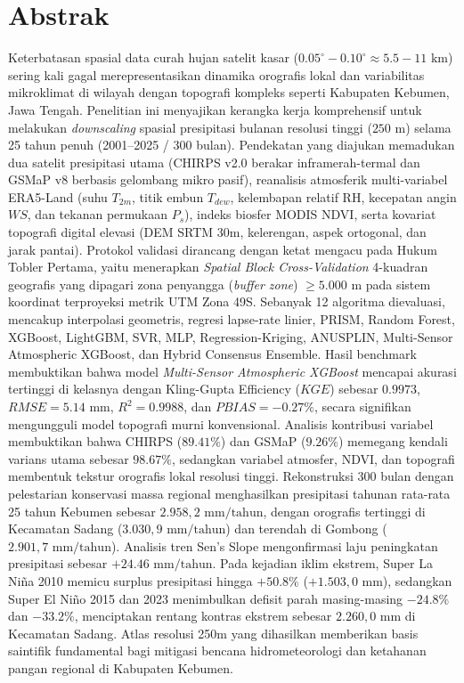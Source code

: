 \documentclass[11pt,a4paper,titlepage]{article}
\begin{document}
\section*{Abstrak}
Keterbatasan spasial data curah hujan satelit kasar ($0.05^\circ - 0.10^\circ \approx 5.5 - 11\text{ km}$) sering kali gagal merepresentasikan dinamika orografis lokal dan variabilitas mikroklimat di wilayah dengan topografi kompleks seperti Kabupaten Kebumen, Jawa Tengah. Penelitian ini menyajikan kerangka kerja komprehensif untuk melakukan \textit{downscaling} spasial presipitasi bulanan resolusi tinggi ($250\text{ m}$) selama 25 tahun penuh (2001--2025 / 300 bulan). Pendekatan yang diajukan memadukan dua satelit presipitasi utama (CHIRPS v2.0 berakar inframerah-termal dan GSMaP v8 berbasis gelombang mikro pasif), reanalisis atmosferik multi-variabel ERA5-Land (suhu $T_{2m}$, titik embun $T_{dew}$, kelembapan relatif $\text{RH}$, kecepatan angin $WS$, dan tekanan permukaan $P_s$), indeks biosfer MODIS NDVI, serta kovariat topografi digital elevasi (DEM SRTM 30m, kelerengan, aspek ortogonal, dan jarak pantai). Protokol validasi dirancang dengan ketat mengacu pada Hukum Tobler Pertama, yaitu menerapkan \textit{Spatial Block Cross-Validation} 4-kuadran geografis yang dipagari zona penyangga (\textit{buffer zone}) $\ge 5.000\text{ m}$ pada sistem koordinat terproyeksi metrik UTM Zona 49S. Sebanyak 12 algoritma dievaluasi, mencakup interpolasi geometris, regresi lapse-rate linier, PRISM, Random Forest, XGBoost, LightGBM, SVR, MLP, Regression-Kriging, ANUSPLIN, Multi-Sensor Atmospheric XGBoost, dan Hybrid Consensus Ensemble. Hasil benchmark membuktikan bahwa model \textit{Multi-Sensor Atmospheric XGBoost} mencapai akurasi tertinggi di kelasnya dengan Kling-Gupta Efficiency ($KGE$) sebesar $0.9973$, $RMSE = 5.14\text{ mm}$, $R^2 = 0.9988$, dan $PBIAS = -0.27\%$, secara signifikan mengungguli model topografi murni konvensional. Analisis kontribusi variabel membuktikan bahwa CHIRPS ($89.41\%$) dan GSMaP ($9.26\%$) memegang kendali varians utama sebesar $98.67\%$, sedangkan variabel atmosfer, NDVI, dan topografi membentuk tekstur orografis lokal resolusi tinggi. Rekonstruksi 300 bulan dengan pelestarian konservasi massa regional menghasilkan presipitasi tahunan rata-rata 25 tahun Kebumen sebesar $2.958,2\text{ mm/tahun}$, dengan orografis tertinggi di Kecamatan Sadang ($3.030,9\text{ mm/tahun}$) dan terendah di Gombong ($2.901,7\text{ mm/tahun}$). Analisis tren Sen's Slope mengonfirmasi laju peningkatan presipitasi sebesar $+24.46\text{ mm/tahun}$. Pada kejadian iklim ekstrem, Super La Niña 2010 memicu surplus presipitasi hingga $+50.8\%$ ($+1.503,0\text{ mm}$), sedangkan Super El Niño 2015 dan 2023 menimbulkan defisit parah masing-masing $-24.8\%$ dan $-33.2\%$, menciptakan rentang kontras ekstrem sebesar $2.260,0\text{ mm}$ di Kecamatan Sadang. Atlas resolusi 250m yang dihasilkan memberikan basis saintifik fundamental bagi mitigasi bencana hidrometeorologi dan ketahanan pangan regional di Kabupaten Kebumen.
\end{document}
